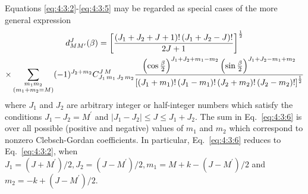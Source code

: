Equations \eqref{eq:4:3:2}-\eqref{eq:4:3:5} may be regarded as special cases of the more general expression
\begin{multline}
d_{M M^{\prime}}^{J}(\beta)=\left[\frac{\left(J_{1}+J_{2}+J+1\right)!\left(J_{1}+J_{2}-J\right)!}{2 J+1}\right]^{\frac{1}{2}}  \\
\times \sum_{\substack{m_{1} m_{2} \\
\left(m_{1}+m_{2}=M\right)}}(-1)^{J_{2}+m_{2}} C_{J_{1}\,m_{1}\,J_{2}\,m_{2}}^{J\,M} \frac{\left(\cos \frac{\beta}{2}\right)^{J_{1}+J_{2}+m_{1}-m_{2}}\left(\sin \frac{\beta}{2}\right)^{J_{1}+J_{2}-m_{1}+m_{2}}}{\left[\left(J_{1}+m_{1}\right)!\left(J_{1}-m_{1}\right)!\left(J_{2}+m_{2}\right)!\left(J_{2}-m_{2}\right)!\right]^{\frac{1}{2}}} \label{eq:4:3:6}
\end{multline}
where $J_{1}$ and $J_{2}$ are arbitrary integer or half-integer numbers which satisfy the conditions $J_{1}-J_{2}=M^{\prime}$ and $\left|J_{1}-J_{2}\right| \leq J \leq J_{1}+J_{2}$. The sum in Eq.~\eqref{eq:4:3:6} is over all possible (positive and negative) values of $m_{1}$ and $m_{2}$ which correspond to nonzero Clebsch-Gordan coefficients. In particular, Eq.~\eqref{eq:4:3:6} reduces to Eq.~\eqref{eq:4:3:2}, when $J_{1}=\left(J+M^{\prime}\right) / 2, J_{2}=\left(J-M^{\prime}\right) / 2, m_{1}=M+k-\left(J-M^{\prime}\right) / 2$ and $m_{2}=-k+\left(J-M^{\prime}\right) / 2$.

